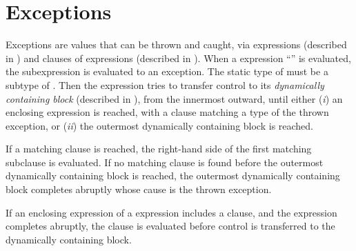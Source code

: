 %
%
%
%

\chapter{Exceptions}


Exceptions are values that can be thrown and caught, via 
expressions (described in )
and  clauses of  expressions (described in
).
When a  expression ``''
is evaluated, the subexpression  is evaluated to an exception.
The static type of  must be a subtype of .
Then the  expression tries to transfer control to
its \emph{dynamically containing block} (described in
), from the innermost outward, until
either (\emph{i}) an enclosing  expression is reached, with a
 clause matching a type of the thrown exception, or (\emph{ii})
the outermost dynamically containing block is reached.

If a matching  clause is reached,
the right-hand side of the first matching subclause is evaluated.  If no
matching  clause is found before the outermost dynamically
containing block is reached, the outermost dynamically containing block
completes abruptly whose cause is the thrown exception.

If an enclosing  expression of a  expression
includes a  clause, and the  expression completes
abruptly, the  clause is evaluated before control is
transferred to the dynamically containing block.


